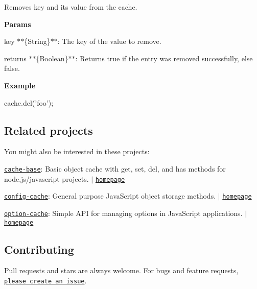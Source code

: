 Removes {\ttfamily key} and its value from the cache.

{\bfseries Params}


\begin{DoxyItemize}
\item {\ttfamily key} $\ast$$\ast$\{String\}$\ast$$\ast$\+: The key of the value to remove.
\item {\ttfamily returns} $\ast$$\ast$\{Boolean\}$\ast$$\ast$\+: Returns {\ttfamily true} if the entry was removed successfully, else {\ttfamily false}.
\end{DoxyItemize}

{\bfseries Example}


\begin{DoxyCode}
cache.del('foo');
\end{DoxyCode}


\subsection*{Related projects}

You might also be interested in these projects\+:


\begin{DoxyItemize}
\item \href{https://www.npmjs.com/package/cache-base}{\tt cache-\/base}\+: Basic object cache with {\ttfamily get}, {\ttfamily set}, {\ttfamily del}, and {\ttfamily has} methods for node.\+js/javascript projects. $\vert$ \href{https://github.com/jonschlinkert/cache-base}{\tt homepage}
\item \href{https://www.npmjs.com/package/config-cache}{\tt config-\/cache}\+: General purpose Java\+Script object storage methods. $\vert$ \href{https://github.com/jonschlinkert/config-cache}{\tt homepage}
\item \href{https://www.npmjs.com/package/option-cache}{\tt option-\/cache}\+: Simple A\+PI for managing options in Java\+Script applications. $\vert$ \href{https://github.com/jonschlinkert/option-cache}{\tt homepage}
\end{DoxyItemize}

\subsection*{Contributing}

Pull requests and stars are always welcome. For bugs and feature requests, \href{https://github.com/jonschlinkert/map-cache/issues/new}{\tt please create an issue}.

